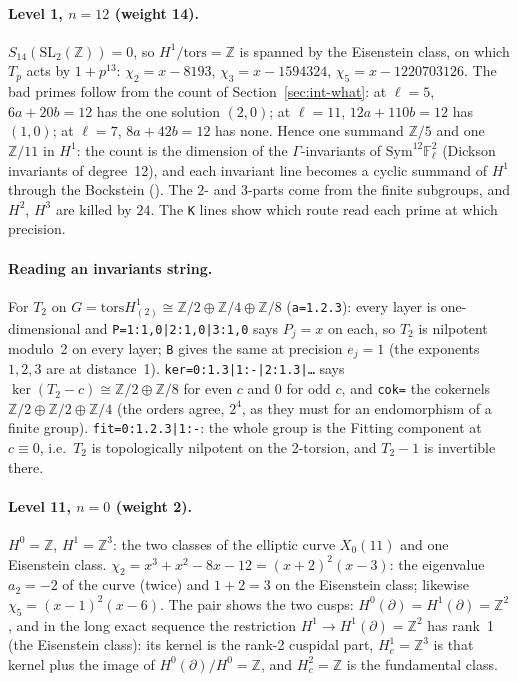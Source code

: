 \documentclass[11pt,openany]{report}
\newcommand{\Z}{\mathbb{Z}}
\newcommand{\Fl}{\mathbb{F}_{\ell}}
\newcommand{\Sym}{\mathrm{Sym}}
\newcommand{\SL}{\mathrm{SL}}
\newcommand{\tors}{\mathrm{tors}}
\begin{document}
\paragraph{Level 1, \texorpdfstring{$n=12$}{n=12} (weight 14).} $S_{14}(\SL_2(\Z))=0$, so $H^1/\tors=\Z$ is spanned by the
Eisenstein class, on which $T_p$ acts by $1+p^{13}$: $\chi_2=x-8193$, $\chi_3=x-1594324$, $\chi_5=x-1220703126$. The bad
primes follow from the count of Section~\ref{sec:int-what}: at $\ell=5$, $6a+20b=12$ has the one solution $(2,0)$; at
$\ell=11$, $12a+110b=12$ has $(1,0)$; at $\ell=7$, $8a+42b=12$ has none. Hence one summand $\Z/5$ and one $\Z/11$ in $H^1$: the count is the dimension of the $\Gamma$-invariants of
$\Sym^{12}\Fl^2$ (Dickson invariants of degree~12), and each invariant line becomes a cyclic summand of $H^1$ through the
Bockstein ({}). The $2$- and $3$-parts come from the finite subgroups, and $H^2$, $H^3$ are killed by $24$. The \texttt{K} lines show which
route read each prime at which precision.

\paragraph{Reading an invariants string.} For $T_2$ on $G=\tors H^1_{(2)}\cong\Z/2\oplus\Z/4\oplus\Z/8$
(\texttt{a=1.2.3}): every layer is one-dimensional and \texttt{P=1:1,0|2:1,0|3:1,0} says $P_j=x$ on each, so $T_2$ is
nilpotent modulo~2 on every layer; \texttt{B} gives the same at precision $e_j=1$ (the exponents $1,2,3$ are at distance~1).
\texttt{ker=0:1.3|1:-|2:1.3|\dots} says $\ker(T_2-c)\cong\Z/2\oplus\Z/8$ for even $c$ and $0$ for odd $c$, and
\texttt{cok=} the cokernels $\Z/2\oplus\Z/2\oplus\Z/4$ (the orders agree, $2^4$, as they must for an endomorphism of a finite
group). \texttt{fit=0:1.2.3|1:-}: the whole group is the Fitting component at $c\equiv0$, i.e.\ $T_2$ is topologically
nilpotent on the 2-torsion, and $T_2-1$ is invertible there.

\paragraph{Level 11, \texorpdfstring{$n=0$}{n=0} (weight 2).} $H^0=\Z$, $H^1=\Z^3$: the two classes of the elliptic curve
$X_0(11)$ and one Eisenstein class. $\chi_2=x^3+x^2-8x-12=(x+2)^2(x-3)$: the eigenvalue $a_2=-2$ of the curve (twice) and
$1+2=3$ on the Eisenstein class; likewise $\chi_5=(x-1)^2(x-6)$. The pair shows the two cusps: $H^0(\partial)=H^1(\partial)=\Z^2$,
and in the long exact sequence the restriction $H^1\to H^1(\partial)=\Z^2$ has rank~1 (the Eisenstein class): its kernel is
the rank-2 cuspidal part, $H^1_c=\Z^3$ is that kernel plus the image of $H^0(\partial)/H^0=\Z$, and $H^2_c=\Z$ is the
fundamental class.
\end{document}
